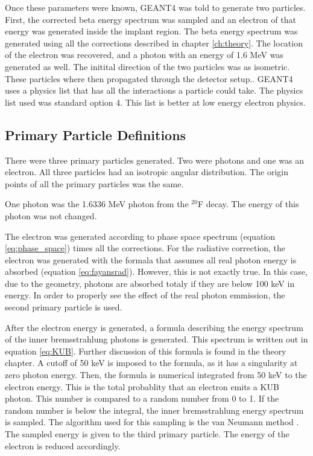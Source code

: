 Once these parameters were known, GEANT4 was told to generate two particles.
First, the corrected beta energy spectrum was sampled and an electron of that energy was generated inside the implant region.
The beta energy spectrum was generated using all the corrections described in chapter \ref{ch:theory}.
The location of the electron was recovered, and a photon with an energy of  1.6 MeV was generated as well.
The initital direction of the two particles was as isometric.
These particles where then propagated through the detector setup..
GEANT4 uses a physics list that has all the interactions a particle could take.
The physics list used was standard option 4.
This list is better at low energy electron physics.

\subsection{Primary Particle Definitions}
There were three primary particles generated.
Two were photons and one was an electron.
All three particles had an isotropic angular distribution.
The origin points of all the primary particles was the same.

One photon was the 1.6336 MeV photon from the $^{20}$F decay.
The energy of this photon was not changed.

The electron was generated according to phase space spectrum (equation \ref{eq:phase_space}) times all the corrections.
For the radiative correction, the electron was generated with the formala that assumes all real photon energy is absorbed (equation \ref{eq:fayansrad}).
However, this is not exactly true. 
In this case, due to the geometry, photons are absorbed totaly if they are below 100 keV in energy.
In order to properly see the effect of the real photon emmission, the second primary particle is used.

After the electron energy is generated, a formula describing the energy spectrum of the inner bremsstrahlung photons is generated. 
This spectrum is written out in equation \ref{eq:KUB}. %
Further discussion of this formula is found in the theory chapter.
A cutoff of 50 keV is imposed to the formula, as it has a singularity at zero photon energy.
Then, the formula is numerical integrated from 50 keV to the electron energy.
This is the total probablity that an electron emits a KUB photon.
This number is compared to a random number from 0 to 1.
If the random number is below the integral, the inner bremsstrahlung energy spectrum is sampled.
The algorithm used for this sampling is the van Neumann method \cite{neu51}.
The sampled energy is given to the third primary particle.
The energy of the electron is reduced accordingly.

